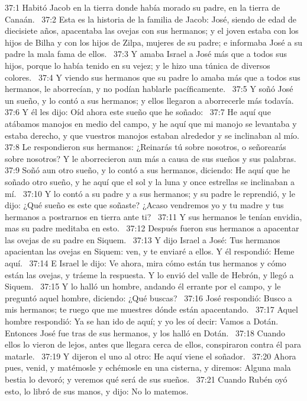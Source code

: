 37:1 Habitó Jacob en la tierra donde había morado su padre, en la tierra de Canaán.  
37:2 Esta es la historia de la familia de Jacob: José, siendo de edad de diecisiete años, apacentaba las ovejas con sus hermanos; y el joven estaba con los hijos de Bilha y con los hijos de Zilpa, mujeres de su padre; e informaba José a su padre la mala fama de ellos.  
37:3 Y amaba Israel a José más que a todos sus hijos, porque lo había tenido en su vejez; y le hizo una túnica de diversos colores.  
37:4 Y viendo sus hermanos que su padre lo amaba más que a todos sus hermanos, le aborrecían, y no podían hablarle pacíficamente.  
37:5 Y soñó José un sueño, y lo contó a sus hermanos; y ellos llegaron a aborrecerle más todavía.  
37:6 Y él les dijo: Oíd ahora este sueño que he soñado:  
37:7 He aquí que atábamos manojos en medio del campo, y he aquí que mi manojo se levantaba y estaba derecho, y que vuestros manojos estaban alrededor y se inclinaban al mío. 
37:8 Le respondieron sus hermanos: ¿Reinarás tú sobre nosotros, o señorearás sobre nosotros? Y le aborrecieron aun más a causa de sus sueños y sus palabras.  
37:9 Soñó aun otro sueño, y lo contó a sus hermanos, diciendo: He aquí que he soñado otro sueño, y he aquí que el sol y la luna y once estrellas se inclinaban a mí.  
37:10 Y lo contó a su padre y a sus hermanos; y su padre le reprendió, y le dijo: ¿Qué sueño es este que soñaste? ¿Acaso vendremos yo y tu madre y tus hermanos a postrarnos en tierra ante ti?  
37:11 Y sus hermanos le tenían envidia, mas su padre meditaba en esto.  
37:12 Después fueron sus hermanos a apacentar las ovejas de su padre en Siquem.  
37:13 Y dijo Israel a José: Tus hermanos apacientan las ovejas en Siquem: ven, y te enviaré a ellos. Y él respondió: Heme aquí.  
37:14 E Israel le dijo: Ve ahora, mira cómo están tus hermanos y cómo están las ovejas, y tráeme la respuesta. Y lo envió del valle de Hebrón, y llegó a Siquem.  
37:15 Y lo halló un hombre, andando él errante por el campo, y le preguntó aquel hombre, diciendo: ¿Qué buscas?  
37:16 José respondió: Busco a mis hermanos; te ruego que me muestres dónde están apacentando.  
37:17 Aquel hombre respondió: Ya se han ido de aquí; y yo les oí decir: Vamos a Dotán. Entonces José fue tras de sus hermanos, y los halló en Dotán.  
37:18 Cuando ellos lo vieron de lejos, antes que llegara cerca de ellos, conspiraron contra él para matarle.  
37:19 Y dijeron el uno al otro: He aquí viene el soñador.  
37:20 Ahora pues, venid, y matémosle y echémosle en una cisterna, y diremos: Alguna mala bestia lo devoró; y veremos qué será de sus sueños.  
37:21 Cuando Rubén oyó esto, lo libró de sus manos, y dijo: No lo matemos.  
